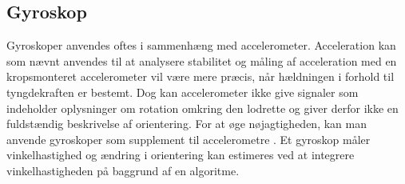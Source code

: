 \subsection{Gyroskop}

Gyroskoper anvendes oftes i sammenhæng med accelerometer. Acceleration kan som nævnt anvendes til at analysere stabilitet og måling af acceleration med en kropsmonteret accelerometer vil være mere præcis, når hældningen i forhold til tyngdekraften er bestemt.
Dog kan accelerometer ikke give signaler som indeholder oplysninger om rotation omkring den lodrette og giver derfor ikke en fuldstændig beskrivelse af orientering.
For at øge nøjagtigheden, kan man anvende gyroskoper som supplement til accelerometre .
Et gyroskop måler vinkelhastighed og ændring i orientering kan estimeres ved at integrere vinkelhastigheden på baggrund af en algoritme.